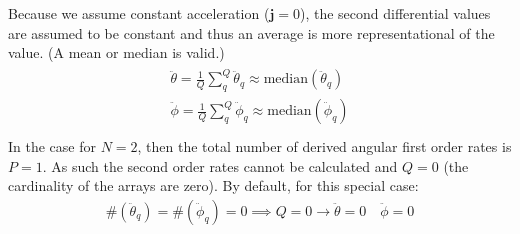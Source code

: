 \documentclass[letterpaper,11pt,english]{sphinxmanual}
\begin{document}
\sphinxAtStartPar
Because we assume constant acceleration (\(\mathbf{j} = 0\)), the second
differential values are assumed to be constant and thus an average is more
representational of the value. (A mean or median is valid.)
\begin{align*}\!\begin{aligned}
\ddot\theta = \frac{1}{Q} \sum_q^Q \ddot\theta_q \approx \mathrm{median} (\ddot\theta_q)\\
\ddot\phi = \frac{1}{Q} \sum_q^Q \ddot\phi_q \approx \mathrm{median} (\ddot\phi_q)\\
\end{aligned}\end{align*}
\sphinxAtStartPar
In the case for \(N=2\), then the total number of derived angular first
order rates is \(P=1\). As such the second order rates cannot be
calculated and \(Q=0\) (the cardinality of the arrays are zero). By
default, for this special case:
\begin{equation*}
\begin{split}\#(\ddot\theta_q) = \#(\ddot\phi_q) = 0 \implies Q = 0 \longrightarrow \ddot\theta = 0 \quad \ddot\phi = 0\end{split}
\end{equation*}
\end{document}
